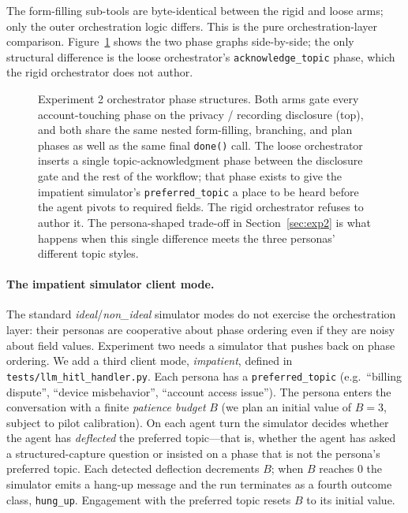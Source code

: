 \documentclass[11pt,a4paper]{article}
\begin{document}
The form-filling sub-tools are byte-identical between the rigid and loose arms; only the outer orchestration logic differs. This is the pure orchestration-layer comparison. Figure~\ref{fig:exp2-orchestrators} shows the two phase graphs side-by-side; the only structural difference is the loose orchestrator's \texttt{acknowledge\_topic} phase, which the rigid orchestrator does not author.

\begin{figure}[htbp]
  \centering
  \resizebox{\linewidth}{!}{}
  \caption{Experiment 2 orchestrator phase structures. Both arms gate
  every account-touching phase on the privacy / recording disclosure
  (top), and both share the same nested form-filling, branching, and plan
  phases as well as the same final \texttt{done()} call. The loose
  orchestrator inserts a single topic-acknowledgment phase between the
  disclosure gate and the rest of the workflow; that phase exists to give
  the impatient simulator's \texttt{preferred\_topic} a place to be heard
  before the agent pivots to required fields. The rigid orchestrator
  refuses to author it. The persona-shaped trade-off in
  Section~\ref{sec:exp2} is what happens when this single difference meets
  the three personas' different topic styles.}
  \label{fig:exp2-orchestrators}
\end{figure}

\paragraph{The impatient simulator client mode.}
The standard \emph{ideal}/\emph{non\_ideal} simulator modes do not exercise the orchestration layer: their personas are cooperative about phase ordering even if they are noisy about field values. Experiment two needs a simulator that pushes back on phase ordering. We add a third client mode, \emph{impatient}, defined in \texttt{tests/llm\_hitl\_handler.py}. Each persona has a \texttt{preferred\_topic} (e.g.\ ``billing dispute'', ``device misbehavior'', ``account access issue''). The persona enters the conversation with a finite \emph{patience budget} $B$ (we plan an initial value of $B=3$, subject to pilot calibration). On each agent turn the simulator decides whether the agent has \emph{deflected} the preferred topic---that is, whether the agent has asked a structured-capture question or insisted on a phase that is not the persona's preferred topic. Each detected deflection decrements $B$; when $B$ reaches $0$ the simulator emits a hang-up message and the run terminates as a fourth outcome class, \texttt{hung\_up}. Engagement with the preferred topic resets $B$ to its initial value.
\end{document}
